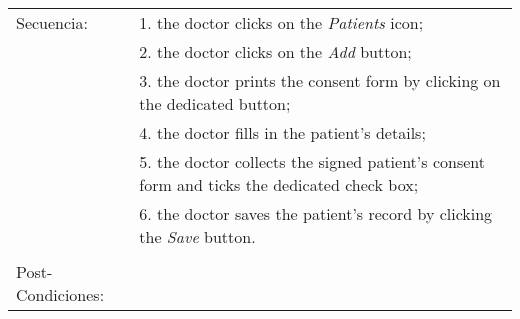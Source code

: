 \begin{longtable}{| p{3.5cm} | p{2.5cm} | p{3.5cm} | p{2.5cm} |}
\hline
Secuencia: & \multicolumn{3}{l|}{\parbox{9cm}{1. the doctor clicks on the \textit{Patients} icon;}}\\
& \multicolumn{3}{l|}{\parbox{9cm}{2. the doctor clicks on the \textit{Add} button;}}\\
& \multicolumn{3}{l|}{\parbox{9cm}{3. the doctor prints the consent form by clicking on the dedicated button;}}\\
& \multicolumn{3}{l|}{\parbox{9cm}{4. the doctor fills in the patient's details;}}\\
& \multicolumn{3}{l|}{\parbox{9cm}{5. the doctor collects the signed patient's consent form and ticks the dedicated check box;}}\\
& \multicolumn{3}{l|}{\parbox{9cm}{6. the doctor saves the patient's record by clicking the \textit{Save} button.}}\\
& \multicolumn{3}{l|}{\parbox{9cm}{}}\\
\hline
Post-Condiciones: & \multicolumn{3}{l|}{ }\\
\hline


\end{longtable}